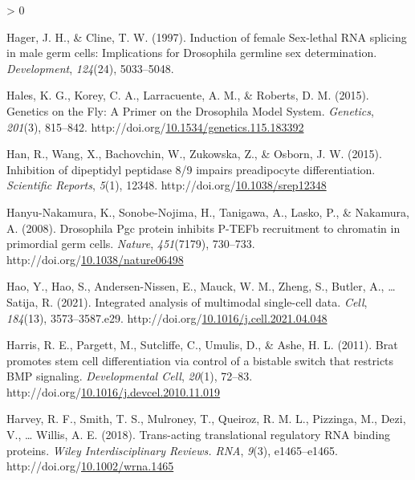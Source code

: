 \documentclass[12pt,oneside]{reedthesis}
\newlength{\cslhangindent}
\newenvironment{CSLReferences}[2] %
 {%
  \setlength{\parindent}{0pt}
  \ifodd #1 \everypar{\setlength{\hangindent}{\cslhangindent}}\ignorespaces\fi
  \ifnum #2 > 0
  \setlength{\parskip}{#2\baselineskip}
  \fi
 }%
 {}
\begin{document}
\begin{CSLReferences}{1}{0}
\leavevmode\hypertarget{ref-Hager1997}{}%
Hager, J. H., \& Cline, T. W. (1997). Induction of female {Sex-lethal RNA} splicing in male germ cells: Implications for {Drosophila} germline sex determination. \emph{Development}, \emph{124}(24), 5033--5048.

\leavevmode\hypertarget{ref-Hales2015a}{}%
Hales, K. G., Korey, C. A., Larracuente, A. M., \& Roberts, D. M. (2015). Genetics on the {Fly}: {A Primer} on the {Drosophila Model System}. \emph{Genetics}, \emph{201}(3), 815--842. http://doi.org/\href{https://doi.org/10.1534/genetics.115.183392}{10.1534/genetics.115.183392}

\leavevmode\hypertarget{ref-hanInhibitionDipeptidylPeptidase2015}{}%
Han, R., Wang, X., Bachovchin, W., Zukowska, Z., \& Osborn, J. W. (2015). Inhibition of dipeptidyl peptidase 8/9 impairs preadipocyte differentiation. \emph{Scientific Reports}, \emph{5}(1), 12348. http://doi.org/\href{https://doi.org/10.1038/srep12348}{10.1038/srep12348}

\leavevmode\hypertarget{ref-Hanyu-Nakamura2008g}{}%
Hanyu-Nakamura, K., Sonobe-Nojima, H., Tanigawa, A., Lasko, P., \& Nakamura, A. (2008). Drosophila {Pgc} protein inhibits {P-TEFb} recruitment to chromatin in primordial germ cells. \emph{Nature}, \emph{451}(7179), 730--733. http://doi.org/\href{https://doi.org/10.1038/nature06498}{10.1038/nature06498}

\leavevmode\hypertarget{ref-haoIntegratedAnalysisMultimodal2021}{}%
Hao, Y., Hao, S., Andersen-Nissen, E., Mauck, W. M., Zheng, S., Butler, A., \ldots{} Satija, R. (2021). Integrated analysis of multimodal single-cell data. \emph{Cell}, \emph{184}(13), 3573--3587.e29. http://doi.org/\href{https://doi.org/10.1016/j.cell.2021.04.048}{10.1016/j.cell.2021.04.048}

\leavevmode\hypertarget{ref-Harris2011i}{}%
Harris, R. E., Pargett, M., Sutcliffe, C., Umulis, D., \& Ashe, H. L. (2011). Brat promotes stem cell differentiation via control of a bistable switch that restricts {BMP} signaling. \emph{Developmental Cell}, \emph{20}(1), 72--83. http://doi.org/\href{https://doi.org/10.1016/j.devcel.2010.11.019}{10.1016/j.devcel.2010.11.019}

\leavevmode\hypertarget{ref-Harvey2018f}{}%
Harvey, R. F., Smith, T. S., Mulroney, T., Queiroz, R. M. L., Pizzinga, M., Dezi, V., \ldots{} Willis, A. E. (2018). Trans-acting translational regulatory {RNA} binding proteins. \emph{Wiley Interdisciplinary Reviews. RNA}, \emph{9}(3), e1465--e1465. http://doi.org/\href{https://doi.org/10.1002/wrna.1465}{10.1002/wrna.1465}


\end{CSLReferences}
\end{document}
